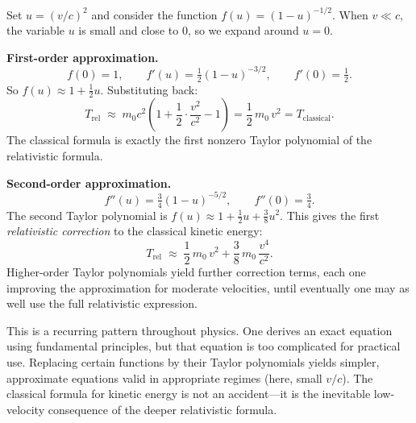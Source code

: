 \begin{example}
\label{ex:14-17}
Set $u=(v/c)^{2}$ and consider the function $f(u)=(1-u)^{-1/2}$.  When $v\ll c$, the variable $u$ is small and close to $0$, so we expand around $u=0$.

\textbf{First-order approximation.}
\[
  f(0)=1, \qquad f'(u)=\tfrac{1}{2}(1-u)^{-3/2}, \qquad f'(0)=\tfrac{1}{2}.
\]
So $f(u) \approx 1+\frac{1}{2}u$.  Substituting back:
\[
  T_{\text{rel}} \;\approx\; m_{0}c^{2}\!\left(1+\frac{1}{2}\cdot\frac{v^{2}}{c^{2}}-1\right)
  = \frac{1}{2}\,m_{0}\,v^{2}
  = T_{\text{classical}}.
\]
The classical formula is exactly the first nonzero Taylor polynomial of the relativistic formula.

\textbf{Second-order approximation.}
\[
  f''(u) = \tfrac{3}{4}(1-u)^{-5/2}, \qquad f''(0) = \tfrac{3}{4}.
\]
The second Taylor polynomial is $f(u)\approx 1+\frac{1}{2}u+\frac{3}{8}u^{2}$.  This gives the first \emph{relativistic correction} to the classical kinetic energy:
\[
  T_{\text{rel}} \;\approx\; \frac{1}{2}\,m_{0}\,v^{2} + \frac{3}{8}\,m_{0}\,\frac{v^{4}}{c^{2}}.
\]
Higher-order Taylor polynomials yield further correction terms, each one improving the approximation for moderate velocities, until eventually one may as well use the full relativistic expression.
\end{example}

\begin{remark}
This is a recurring pattern throughout physics.  One derives an exact equation using fundamental principles, but that equation is too complicated for practical use.  Replacing certain functions by their Taylor polynomials yields simpler, approximate equations valid in appropriate regimes (here, small $v/c$).  The classical formula for kinetic energy is not an accident---it is the inevitable low-velocity consequence of the deeper relativistic formula.
\end{remark}
